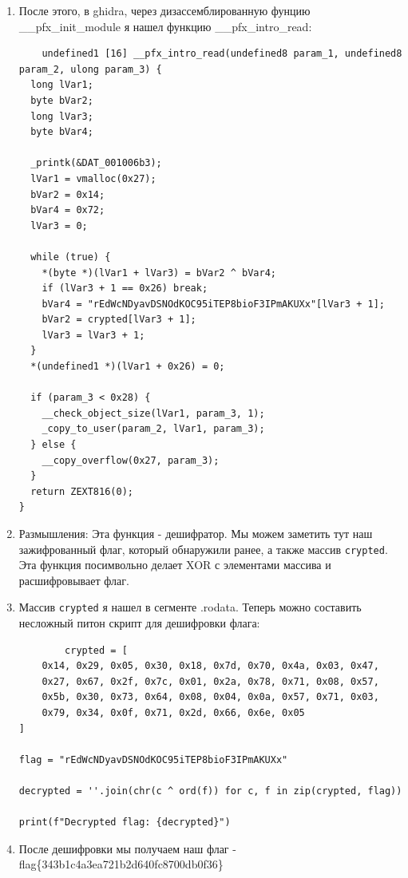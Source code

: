 \begin{enumerate}
    \item После этого, в ghidra, через дизассемблированную фунцию \_\_pfx\_init\_module я нашел функцию \_\_pfx\_intro\_read:

    \begin{verbatim}
    undefined1 [16] __pfx_intro_read(undefined8 param_1, undefined8 param_2, ulong param_3) {
  long lVar1;
  byte bVar2;
  long lVar3;
  byte bVar4;

  _printk(&DAT_001006b3);
  lVar1 = vmalloc(0x27);
  bVar2 = 0x14;
  bVar4 = 0x72;
  lVar3 = 0;

  while (true) {
    *(byte *)(lVar1 + lVar3) = bVar2 ^ bVar4;
    if (lVar3 + 1 == 0x26) break;
    bVar4 = "rEdWcNDyavDSNOdKOC95iTEP8bioF3IPmAKUXx"[lVar3 + 1];
    bVar2 = crypted[lVar3 + 1];
    lVar3 = lVar3 + 1;
  }
  *(undefined1 *)(lVar1 + 0x26) = 0;

  if (param_3 < 0x28) {
    __check_object_size(lVar1, param_3, 1);
    _copy_to_user(param_2, lVar1, param_3);
  } else {
    __copy_overflow(0x27, param_3);
  }
  return ZEXT816(0);
}
    \end{verbatim}

    \item Размышления: Эта функция - дешифратор. Мы можем заметить тут наш зажифрованный флаг, который обнаружили ранее, а также массив \texttt{crypted}. Эта функция посимвольно делает XOR с элементами массива и расшифровывает флаг.

    \item Массив \texttt{crypted} я нашел в сегменте .rodata. Теперь можно составить несложный питон скрипт для дешифровки флага:
    \begin{verbatim}
        crypted = [
    0x14, 0x29, 0x05, 0x30, 0x18, 0x7d, 0x70, 0x4a, 0x03, 0x47,
    0x27, 0x67, 0x2f, 0x7c, 0x01, 0x2a, 0x78, 0x71, 0x08, 0x57,
    0x5b, 0x30, 0x73, 0x64, 0x08, 0x04, 0x0a, 0x57, 0x71, 0x03,
    0x79, 0x34, 0x0f, 0x71, 0x2d, 0x66, 0x6e, 0x05
]

flag = "rEdWcNDyavDSNOdKOC95iTEP8bioF3IPmAKUXx"

decrypted = ''.join(chr(c ^ ord(f)) for c, f in zip(crypted, flag))

print(f"Decrypted flag: {decrypted}")

    \end{verbatim}
    \item После дешифровки мы получаем наш флаг - flag\{343b1c4a3ea721b2d640fc8700db0f36\}
\end{enumerate}

\vspace{0.5cm}

